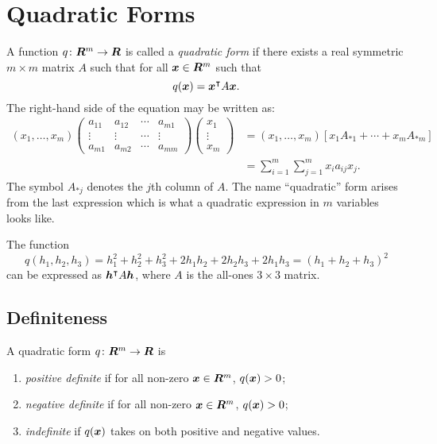 \section{Quadratic Forms}

A function $q \colon \bm{R}^m \rightarrow \bm{R}$ is called a \emph{quadratic form}
if there exists a real symmetric $m \times m$ matrix $A$ such that for all
$\boldsymbol{x} \in \bm{R}^m$ such that
\[
	q(\boldsymbol{x}) = \boldsymbol{x}^{\intercal} A \boldsymbol{x}.
\]
The right-hand side of the equation may be written as:
\begin{align*}
(x_1, \ldots, x_m) \begin{pmatrix}
						a_{11} & a_{12} & \cdots & a_{m 1} \\
						\vdots & \vdots & \cdots & \vdots \\
						a_{m1} & a_{m2} & \cdots & a_{mm}
                   \end{pmatrix}
				   \begin{pmatrix}
						x_1 \\
						\vdots \\
						x_m
				   \end{pmatrix} & = (x_1, \ldots, x_m) [x_1 A_{* 1} + \cdots + x_m A_{* m}] \\
								 & = \sum_{i = 1}^m \sum_{j = 1}^m x_i a_{ij} x_j.
\end{align*}
The symbol $A_{* j}$ denotes the $j$th column of $A$. The name ``quadratic'' form arises
from the last expression which is what a quadratic expression in $m$ variables looks like.
\begin{example}
The function
\[
	q(h_1, h_2, h_3) = h_1^2 + h_2^2 + h_3^2 + 2h_1h_2 + 2h_2h_3 + 2h_1h_3 = (h_1 + h_2 + h_3)^2
\]
can be expressed as $\boldsymbol{h}^{\intercal} A \boldsymbol{h}$, where $A$ is the all-ones $3 \times 3$ matrix.
\end{example}

\subsection{Definiteness}
A quadratic form $q \colon \bm{R}^m \rightarrow \bm{R}$ is
\begin{enumerate}
	\item \emph{positive definite} if for all non-zero $\boldsymbol{x} \in \bm{R}^m$, $q(\boldsymbol{x}) > 0$;
	\item \emph{negative definite} if for all non-zero $\boldsymbol{x} \in \bm{R}^m$, $q(\boldsymbol{x}) > 0$;
	\item \emph{indefinite} if $q(\boldsymbol{x})$ takes on both positive and negative values.
\end{enumerate}

